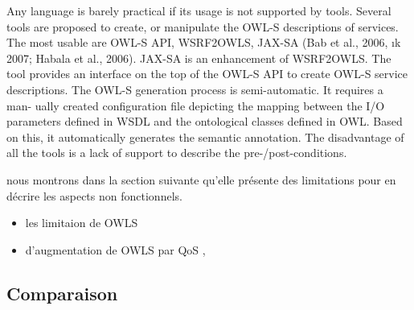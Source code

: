 {      Any language is barely practical if its usage is not supported
      by tools. Several tools are proposed to create, or manipulate
      the OWL-S descriptions of services.  The most usable are OWL-S
      API, WSRF2OWLS, JAX-SA (Bab  et al., 2006, ık 2007; Habala et
      al., 2006). JAX-SA is an enhancement of WSRF2OWLS. The tool
      provides an interface on the top of the OWL-S API to create
      OWL-S service descriptions. The OWL-S generation process is
      semi-automatic. It requires a man- ually created configuration
      file depicting the mapping between the I/O parameters defined in
      WSDL and the ontological classes defined in OWL. Based on this,
      it automatically generates the semantic annotation. The
      disadvantage of all the tools is a lack of support to describe
      the pre-/post-conditions.\cite{bartalos2011effective}

      nous montrons dans la section suivante qu’elle présente des
      limitations pour en décrire les aspects non
      fonctionnels.\cite{jean2012prise}

      \begin{itemize}
        \item les limitaion de OWLS \cite{jean2012prise}
        \item d'augmentation de OWLS par QoS \cite{baryannis2010},
          \cite{kritikos2009requirements}
      \end{itemize}
    }
    \newpage
    \subsection{Comparaison}
    \label{sec:langs-comparaison}

